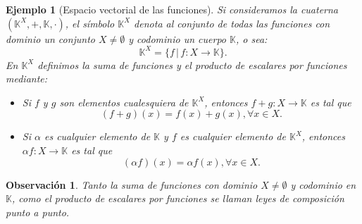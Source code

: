 \documentclass[b5paper, 11pt]{book}
\newcommand{\0}{\mathbf{0}}
\newcommand{\K}{\mathds{K}}
\newtheorem{obs}{Observación}[chapter]
\theoremstyle{estiloB}
\newtheorem{ejemg}{Ejemplo}[chapter]
\theoremstyle{estiloC}
\theoremstyle{estiloD}
\theoremstyle{estiloE}
\begin{document}
\begin{ejemg}[Espacio vectorial de las funciones]\label{ev.f}
Si consideramos la cuaterna $(\K^{X}, +, \K, \cdot)$, el símbolo $\K^{X}$ denota al conjunto de todas las funciones con dominio un conjunto $X \neq \emptyset$ y codominio un cuerpo $\K$, o sea:
\[ \K^{X}= \{ f \,|\, f: X \to \K \}. \]
En $\K^{X}$ definimos la suma de funciones y el producto de escalares por funciones mediante: 

\begin{itemize}
\item[\textit{i)}] Si $f$ y $g$ son elementos cualesquiera de $\K^{X}$, entonces $f+g: X \to \K$ es tal que
\[ (f+g)(x)= f(x)+ g(x), \forall x \in X.\]

\item[\textit{ii)}] Si $\alpha$ es cualquier elemento de $\K$ y $f$ es cualquier elemento de $\K^{X}$, entonces $\alpha f: X \to \K$ es tal que
\[ (\alpha f)(x)= \alpha f(x), \forall x \in X. \]
\end{itemize}
\end{ejemg}

\begin{obs}
Tanto la suma de funciones con dominio $X \neq \emptyset$ y codominio en $\K$, como el producto de escalares por funciones se llaman leyes de composición punto a punto.
\end{obs}
\end{document}
